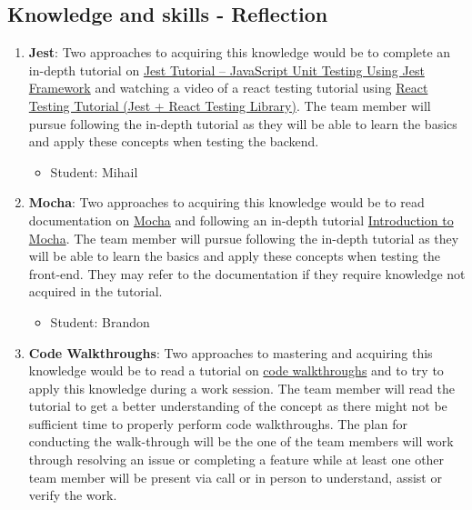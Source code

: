 \documentclass[12pt, titlepage]{article}
\begin{document}
\subsection{Knowledge and skills - Reflection  }
\begin{enumerate} %
    \item \textbf{Jest}: Two approaches to acquiring this knowledge would be to complete an in-depth tutorial on \href{https://www.softwaretestinghelp.com/jest-testing-tutorial/}{Jest Tutorial – JavaScript Unit Testing Using Jest Framework} and watching a video of a react testing tutorial using \href{https://www.youtube.com/watch?v=ML5egqL3YFE}{React Testing Tutorial (Jest + React Testing Library)}. The team member will pursue following the in-depth tutorial as they will be able to learn the basics and apply these concepts when testing the backend.
        \begin{itemize}
            \item Student: Mihail 
        \end{itemize}
    \item \textbf{Mocha}: Two approaches to acquiring this knowledge would be to read documentation on \href{https://mochajs.org/}{Mocha} and following an in-depth tutorial \href{https://www.w3resource.com/mocha/getting-started.php}{Introduction to Mocha}. The team member will pursue following the in-depth tutorial as they will be able to learn the basics and apply these concepts when testing the front-end. They may refer to the documentation if they require knowledge not acquired in the tutorial.
        \begin{itemize}
                \item Student: Brandon
            \end{itemize}
    \item \textbf{Code Walkthroughs}: Two approaches to mastering and acquiring this knowledge would be to read a tutorial on \href{https://www.tutorialspoint.com/software_testing_dictionary/code_walkthrough.htm}{code walkthroughs} and to try to apply this knowledge during a work session. The team member will read the tutorial to get a better understanding of the concept as there might not be sufficient time to properly perform code walkthroughs. The plan for conducting the walk-through will be the one of the team members will work through resolving an issue or completing a feature while at least one other team member will be present via call or in person to understand, assist or verify the work.

\end{enumerate}
\end{document}
